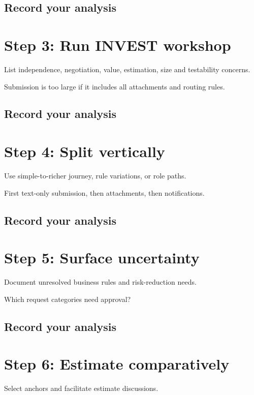 \documentclass[11pt,letterpaper]{article}
\begin{document}
\subsection{Record your analysis}
\section{Step 3: Run INVEST workshop}
List independence, negotiation, value, estimation, size and testability concerns.

\begin{tcolorbox}[colback=tealback,colframe=navy,title={Illustration},breakable]
Submission is too large if it includes all attachments and routing rules.

\end{tcolorbox}
\subsection{Record your analysis}
\section{Step 4: Split vertically}
Use simple-to-richer journey, rule variations, or role paths.

\begin{tcolorbox}[colback=tealback,colframe=navy,title={Illustration},breakable]
First text-only submission, then attachments, then notifications.

\end{tcolorbox}
\subsection{Record your analysis}
\section{Step 5: Surface uncertainty}
Document unresolved business rules and risk-reduction needs.

\begin{tcolorbox}[colback=tealback,colframe=navy,title={Illustration},breakable]
Which request categories need approval?

\end{tcolorbox}
\subsection{Record your analysis}
\section{Step 6: Estimate comparatively}
Select anchors and facilitate estimate discussions.
\end{document}
